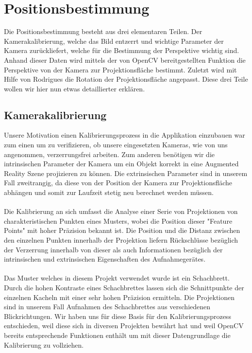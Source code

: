 \documentclass[main.tex]{subfiles}
\begin{document}
\section{Positionsbestimmung}
Die Positionsbestimmung besteht aus drei elementaren Teilen. Der Kamerakalibrierung, welche das Bild entzerrt und wichtige Parameter der Kamera zurückliefert, welche für die Bestimmung der Perspektive wichtig sind. Anhand dieser Daten wird mittels der von OpenCV bereitgestellten Funktion die Perspektive von der Kamera zur Projektionsfläche bestimmt. Zuletzt wird mit Hilfe von Rodrigues die Rotation der Projektionsfläche angepasst. Diese drei Teile wollen wir hier nun etwas detaillierter erklären.

\subsection{Kamerakalibrierung}
Unsere Motivation einen Kalibrierungsprozess in die Applikation einzubauen war zum einen um zu verifizieren, ob unsere eingesetzten Kameras, wie von uns angenommen, verzerrungsfrei arbeiten. Zum anderen benötigen wir die intrinsischen Parameter der Kamera um ein Objekt korrekt in eine Augmented Reality Szene projizieren zu können. Die extrinsischen Parameter sind in unserem Fall zweitrangig, da diese von der Position der Kamera zur Projektionsfläche abhängen und somit zur Laufzeit stetig neu berechnet werden müssen.
\paragraph{}
Die Kalibrierung an sich umfasst die Analyse einer Serie von Projektionen von charakteristischen Punkten eines Musters, wobei die Position dieser "Feature Points" mit hoher Präzision bekannt ist. Die Position und die Distanz zwischen den einzelnen Punkten innerhalb der Projektion liefern Rückschlüsse bezüglich der Verzerrung innerhalb von dieser als auch Informationen bezüglich der intrinsischen und extrinsischen Eigenschaften des Aufnahmegerätes. 
\paragraph{}
Das Muster welches in diesem Projekt verwendet wurde ist ein Schachbrett. Durch die hohen Kontraste eines Schachbrettes lassen sich die Schnittpunkte der einzelnen Kacheln mit einer sehr hohen Präzision ermitteln. Die Projektionen sind in unserem Fall Aufnahmen des Schachbrettes aus verschiedenen Blickrichtungen. Wir haben uns für diese Basis für den Kalibrierungsprozess entschieden, weil diese sich in diversen Projekten bewährt hat und weil OpenCV bereits entsprechende Funktionen enthält um mit dieser Datengrundlage die Kalibrierung zu vollziehen. 
\end{document}
